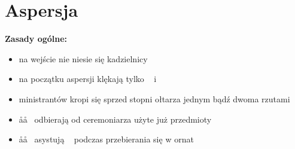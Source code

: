 \section{Aspersja}



\textbf{Zasady ogólne:}
\begin{itemize}
	\item na wejście nie niesie się kadzielnicy
	\item na początku aspersji klękają tylko \ii~ i \cc~
	\item ministrantów kropi się sprzed stopni ołtarza jednym bądź dwoma rzutami
	\item \aa\aa~ odbierają od ceremoniarza użyte już przedmioty
	\item \aa\aa~ asystują \ii~ podczas przebierania się w ornat
\end{itemize}

\bigskip

